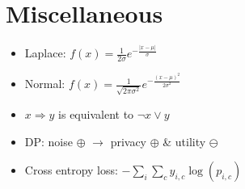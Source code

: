 \section{Miscellaneous}
\begin{itemize}
  \item Laplace: $f(x)=\frac{1}{2\sigma}e^{-\frac{|x-\mu|}{\sigma}}$
  \item Normal: $f(x)=\frac{1}{\sqrt{2\pi\sigma^2}}e^{-\frac{(x-\mu)^2}{2\sigma^2}}$
  \item $x\Rightarrow y$ is equivalent to $\neg x \lor y$
  \item DP: noise $\oplus$ $\rightarrow$ privacy $\oplus$ \& utility $\ominus$
  \item Cross entropy loss: $-\sum_i\sum_c y_{i,c}\log(p_{i,c})$
\end{itemize}
